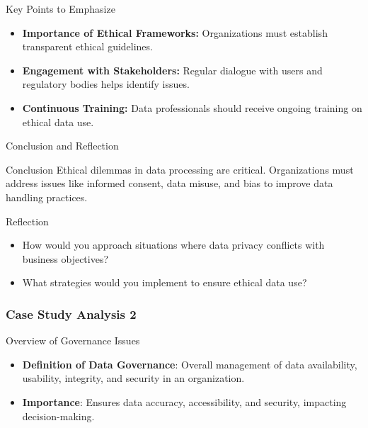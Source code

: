 \documentclass[aspectratio=169]{beamer}
\begin{document}
\begin{frame}[fragile]{Key Points to Emphasize}
  \begin{itemize}
    \item \textbf{Importance of Ethical Frameworks:} 
      Organizations must establish transparent ethical guidelines.
    
    \item \textbf{Engagement with Stakeholders:} 
      Regular dialogue with users and regulatory bodies helps identify issues.

    \item \textbf{Continuous Training:} 
      Data professionals should receive ongoing training on ethical data use.
  \end{itemize}
\end{frame}

\begin{frame}[fragile]{Conclusion and Reflection}
  \begin{block}{Conclusion}
    Ethical dilemmas in data processing are critical. Organizations must address issues like informed consent, data misuse, and bias to improve data handling practices.
  \end{block}
  \begin{block}{Reflection}
    \begin{itemize}
      \item How would you approach situations where data privacy conflicts with business objectives?
      \item What strategies would you implement to ensure ethical data use?
    \end{itemize}
  \end{block}
\end{frame}

\begin{frame}[fragile]
    \frametitle{Case Study Analysis 2}
    \begin{block}{Overview of Governance Issues}
        \begin{itemize}
            \item \textbf{Definition of Data Governance}: Overall management of data availability, usability, integrity, and security in an organization.
            \item \textbf{Importance}: Ensures data accuracy, accessibility, and security, impacting decision-making.
        \end{itemize}
    \end{block}
\end{frame}
\end{document}
